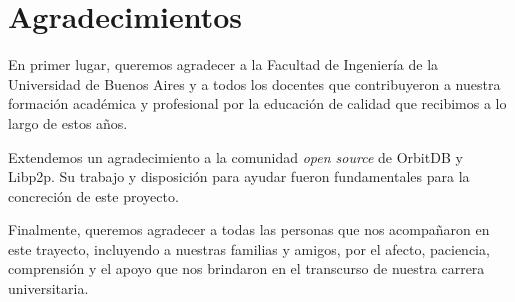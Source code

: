 \newpage
\section{Agradecimientos}

En primer lugar, queremos agradecer a la Facultad de Ingeniería de la Universidad de Buenos Aires y a todos los docentes que contribuyeron a nuestra formación académica y profesional por la educación de calidad que recibimos a lo largo de estos años.

Extendemos un agradecimiento a la comunidad \textit{open source} de OrbitDB y Libp2p. Su trabajo y disposición para ayudar fueron fundamentales para la concreción de este proyecto.

Finalmente, queremos agradecer a todas las personas que nos acompañaron en este trayecto, incluyendo a nuestras familias y amigos, por el afecto, paciencia, comprensión y el apoyo que nos brindaron en el transcurso de nuestra carrera universitaria.

\newpage